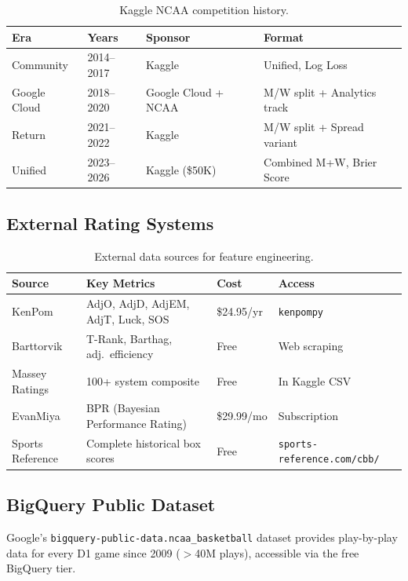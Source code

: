 \documentclass[11pt,a4paper]{article}
\begin{document}
\begin{table}[h]
\centering
\caption{Kaggle NCAA competition history.}
\label{tab:kaggle-history}
\small
\begin{tabular}{@{}llll@{}}
\toprule
\textbf{Era} & \textbf{Years} & \textbf{Sponsor} & \textbf{Format} \\
\midrule
Community & 2014--2017 & Kaggle & Unified, Log Loss \\
Google Cloud & 2018--2020 & Google Cloud + NCAA & M/W split + Analytics track \\
Return & 2021--2022 & Kaggle & M/W split + Spread variant \\
Unified & 2023--2026 & Kaggle (\$50K) & Combined M+W, Brier Score \\
\bottomrule
\end{tabular}
\end{table}

\subsection{External Rating Systems}

\begin{table}[h]
\centering
\caption{External data sources for feature engineering.}
\label{tab:external-data}
\small
\begin{tabular}{@{}llll@{}}
\toprule
\textbf{Source} & \textbf{Key Metrics} & \textbf{Cost} & \textbf{Access} \\
\midrule
KenPom & AdjO, AdjD, AdjEM, AdjT, Luck, SOS & \$24.95/yr & \texttt{kenpompy} \\
Barttorvik & T-Rank, Barthag, adj.\ efficiency & Free & Web scraping \\
Massey Ratings & 100+ system composite & Free & In Kaggle CSV \\
EvanMiya & BPR (Bayesian Performance Rating) & \$29.99/mo & Subscription \\
Sports Reference & Complete historical box scores & Free & \texttt{sports-reference.com/cbb/} \\
\bottomrule
\end{tabular}
\end{table}

\subsection{BigQuery Public Dataset}

Google's \texttt{bigquery-public-data.ncaa\_basketball} dataset provides play-by-play data for every D1 game since 2009 ($>$40M plays), accessible via the free BigQuery tier.
\end{document}
